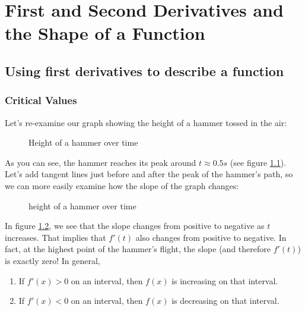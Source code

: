 \chapter{First and Second Derivatives and the Shape of a Function}
\section{Using first derivatives to describe a function}
\subsection{Critical Values}

Let's re-examine our graph showing the height of a hammer tossed in the air:


\begin{figure}
\centering
{}
\caption{Height of a hammer over time}
\label{ref:hammerh}
\end{figure}


As you can see, the hammer reaches its peak around $t \approx 0.5s$ (see 
figure \ref{ref:hammerh}). Let's add tangent lines just before and after the 
peak of the hammer's path, so we can more easily examine how the slope of the 
graph changes:

\begin{figure}
\centering
{}
\caption{height of a hammer over time}
\label{ref:hammerh2}
\end{figure}


In figure \ref{ref:hammerh2}, we see that the slope changes from positive to 
negative as $t$ increases. That implies that $f'(t)$ also changes from positive 
to negative. In fact, at the highest point of the hammer's flight, the slope 
(and therefore $f'(t)$) is exactly zero! In general, 
\begin{enumerate}
	\item If $f'(x)>0$ on an interval, then $f(x)$ is increasing on that 
	interval.
	\item If $f'(x)<0$ on an interval, then $f(x)$ is decreasing on that 
	interval. 
\end{enumerate}

